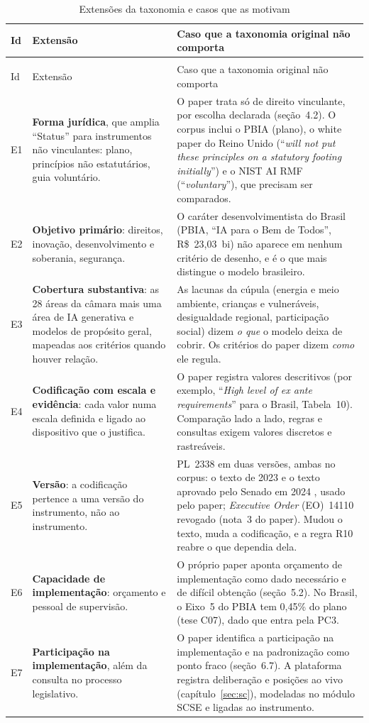 \documentclass[12pt,a4paper,oneside,english,brazil]{abntex2}
\begin{document}
{\small
\begin{longtable}{>{\raggedright\arraybackslash}p{9mm} >{\raggedright\arraybackslash}p{48mm} >{\raggedright\arraybackslash}p{87mm}}
\caption{Extensões da taxonomia e casos que as motivam}\label{tab:extensoes}\\
\toprule
Id & Extensão & Caso que a taxonomia original não comporta\\
\midrule\endfirsthead
\multicolumn{3}{l}{(continuação)}\\
\toprule
Id & Extensão & Caso que a taxonomia original não comporta\\
\midrule\endhead
\bottomrule\endlastfoot
E1 & \textbf{Forma jurídica}, que amplia ``Status'' para instrumentos não vinculantes: plano, princípios não estatutários, guia voluntário. & O paper trata só de direito vinculante, por escolha declarada (seção~4.2). O corpus inclui o PBIA (plano), o white paper do Reino Unido (``\emph{will not put these principles on a statutory footing initially}'') e o NIST AI RMF (``\emph{voluntary}''), que precisam ser comparados.\\
E2 & \textbf{Objetivo primário}: direitos, inovação, desenvolvimento e soberania, segurança. & O caráter desenvolvimentista do Brasil (PBIA, ``IA para o Bem de Todos'', R\$~23,03~bi) não aparece em nenhum critério de desenho, e é o que mais distingue o modelo brasileiro.\\
E3 & \textbf{Cobertura substantiva}: as 28 áreas da câmara mais uma área de IA generativa e modelos de propósito geral, mapeadas aos critérios quando houver relação. & As lacunas da cúpula (energia e meio ambiente, crianças e vulneráveis, desigualdade regional, participação social) dizem \emph{o que} o modelo deixa de cobrir. Os critérios do paper dizem \emph{como} ele regula.\\
E4 & \textbf{Codificação com escala e evidência}: cada valor numa escala definida e ligado ao dispositivo que o justifica. & O paper registra valores descritivos (por exemplo, ``\emph{High level of ex ante requirements}'' para o Brasil, Tabela~10). Comparação lado a lado, regras e consultas exigem valores discretos e rastreáveis.\\
E5 & \textbf{Versão}: a codificação pertence a uma versão do instrumento, não ao instrumento. & PL~2338 em duas versões, ambas no corpus: o texto de 2023 e o texto aprovado pelo Senado em 2024 \cite{pl2338-2024}, usado pelo paper; \emph{Executive Order} (EO)~14110 revogado (nota~3 do paper). Mudou o texto, muda a codificação, e a regra R10 reabre o que dependia dela.\\
E6 & \textbf{Capacidade de implementação}: orçamento e pessoal de supervisão. & O próprio paper aponta orçamento de implementação como dado necessário e de difícil obtenção (seção~5.2). No Brasil, o Eixo~5 do PBIA tem 0,45\% do plano (tese C07), dado que entra pela PC3.\\
E7 & \textbf{Participação na implementação}, além da consulta no processo legislativo. & O paper identifica a participação na implementação e na padronização como ponto fraco (seção~6.7). A plataforma registra deliberação e posições ao vivo (capítulo~\ref{sec:sc}), modeladas no módulo SCSE e ligadas ao instrumento.\\
\end{longtable}}
\end{document}
